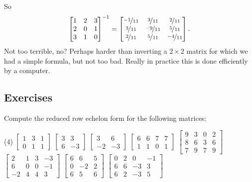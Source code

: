 So
\begin{equation*}
{\begin{bmatrix}
1 & 2 & 3 \\
2 & 0 & 1 \\
3 & 1 & 0
\end{bmatrix}}^{-1}
=
\begin{bmatrix}
\nicefrac{-1}{11} & \nicefrac{3}{11} & \nicefrac{2}{11} \\
\nicefrac{3}{11} & \nicefrac{-9}{11} & \nicefrac{5}{11} \\
\nicefrac{2}{11} & \nicefrac{5}{11} & \nicefrac{-4}{11}
\end{bmatrix} .
\end{equation*}
Not too terrible, no?  Perhaps harder than inverting a $2 \times 2$ matrix
for which we had a simple formula, but not too bad.  Really in practice this 
is done efficiently by a computer.

\subsection{Exercises}

\begin{samepage}
\begin{exercise}
Compute the reduced row echelon form for the following matrices:
\begin{tasks}(4)
\task
$\begin{bmatrix}
1 & 3 & 1 \\
0 & 1 & 1
\end{bmatrix}$
\task
$\begin{bmatrix}
3 & 3 \\
6 & -3
\end{bmatrix}$
\task
$\begin{bmatrix}
3 & 6 \\
-2 & -3
\end{bmatrix}$
\task
$\begin{bmatrix}
6 & 6 & 7 & 7 \\
1 & 1 & 0 & 1
\end{bmatrix}$
\task
$\begin{bmatrix}
9 & 3 & 0 & 2 \\
8 & 6 & 3 & 6 \\
7 & 9 & 7 & 9
\end{bmatrix}$
\task
$\begin{bmatrix}
2 & 1 & 3 & -3 \\
6 & 0 & 0 & -1 \\
-2 & 4 & 4 & 3
\end{bmatrix}$
\task
$\begin{bmatrix}
6 & 6 & 5 \\
0 & -2 & 2 \\
6 & 5 & 6
\end{bmatrix}$
\task
$\begin{bmatrix}
0 & 2 & 0 & -1 \\
6 & 6 & -3 & 3 \\
6 & 2 & -3 & 5
\end{bmatrix}$
\end{tasks}
\end{exercise}
\end{samepage}

